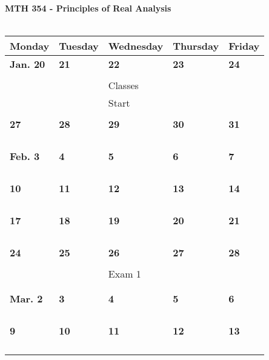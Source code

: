 \documentclass[letter, 12pt]{article}
\begin{document}
\begin{center}
{\bf MTH 354 - Principles of Real Analysis}\\
\ \\
\begin{tabular}{|l|l|l|l|l|}
\hline
{\bf \phantom{xx}Monday\phantom{x}} & {\bf \phantom{xx}Tuesday\phantom{x}} & {\bf \phantom{x}Wednesday\phantom{}} & {\bf \phantom{x}Thursday\phantom{x}} & {\bf \phantom{xx}Friday\phantom{xx}} \\
\hline
\textbf{Jan. 20}&\textbf{21}&\textbf{22}&\textbf{23}&\textbf{24}\\
&  &  &  & \\
&  & Classes &  & \\
&  & Start &  & \\
&  &  &  & \\
\hline
\textbf{27}&\textbf{28}&\textbf{29}&\textbf{30}&\textbf{31}\\
&  &  &  & \\
&  &  &  & \\
&  &  &  & \\
&  &  &  & \\
\hline
\textbf{Feb. 3}&\textbf{4}&\textbf{5}&\textbf{6}&\textbf{7}\\
&  &  &  & \\
&  &  &  & \\
&  &  &  & \\
&  &  &  & \\
\hline
\textbf{10}&\textbf{11}&\textbf{12}&\textbf{13}&\textbf{14}\\
&  &  &  & \\
&  &  &  & \\
&  &  &  & \\
&  &  &  & \\
\hline
\textbf{17}&\textbf{18}&\textbf{19}&\textbf{20}&\textbf{21}\\
&  &  &  & \\
&  &  &  & \\
&  &  &  & \\
&  &  &  & \\
\hline
\textbf{24}&\textbf{25}&\textbf{26}&\textbf{27}&\textbf{28}\\
&  &  &  & \\
&  &Exam 1  &  & \\
&  &  &  & \\
&  &  &  & \\
\hline
\textbf{Mar. 2}&\textbf{3}&\textbf{4}&\textbf{5}&\textbf{6}\\
&  &  &  & \\
&  &  &  & \\
&  &  &  & \\
&  &  &  & \\
\hline
\textbf{9}&\textbf{10}&\textbf{11}&\textbf{12}&\textbf{13}\\
&  &  &  & \\
&  &  &  & \\
&  &  &  & \\
&  &  &  & \\
\hline
\end{tabular}
\end{center}
\end{document}

